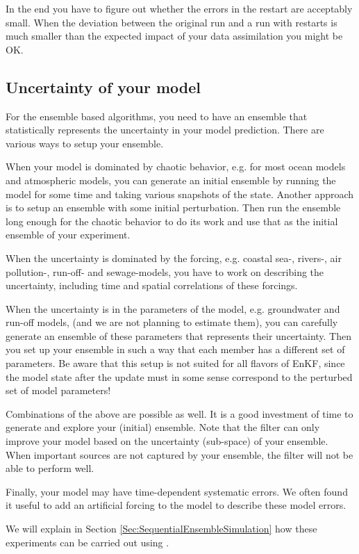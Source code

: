 In the end you have to figure out whether the errors in the restart are acceptably small. When the deviation between the original run and a run with restarts is much smaller than the expected impact of your data assimilation you might be OK.

\subsection{Uncertainty of your model}
For the ensemble based algorithms, you need to have an ensemble that statistically represents the uncertainty in your model prediction. There are various ways to setup your ensemble. 

When your model is dominated by chaotic behavior, e.g. for most ocean models and atmospheric models, you can generate an initial ensemble by running the model for some time and taking various snapshots of the state. Another approach is to setup an ensemble with some initial perturbation. Then run the ensemble long enough for the chaotic behavior to do its work and use that as the initial ensemble of your experiment.

When the uncertainty is dominated by the forcing, e.g. coastal sea-, rivers-, air pollution-, run-off- and sewage-models, you have to work on describing the uncertainty, including time and spatial correlations of these forcings.

When the uncertainty is in the parameters of the model, e.g.  groundwater and run-off models, (and we are not planning to estimate them), you can carefully generate an ensemble of these parameters that represents their uncertainty. Then you set up your ensemble in such a way that each member has a different set of parameters.  Be aware that this setup is not suited for all flavors of EnKF, since the model state after the update must in some sense correspond to the perturbed set of model parameters!

Combinations of the above are possible as well. It is a good investment of time to generate and explore your (initial) ensemble. Note that the filter can only improve your model based on the uncertainty (sub-space) of your ensemble. When important sources are not captured by your ensemble, the filter will not be able to perform well. 

Finally, your model may have time-dependent systematic errors. We often found it useful to add an artificial forcing to the model to describe these model errors.

We will explain in Section \ref{Sec:SequentialEnsembleSimulation} how these experiments can be carried out using \oda.


